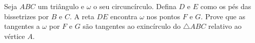 Seja $ABC$ um triângulo e $\omega$ o seu circuncírculo. Defina $D$ e $E$ como os pés das bissetrizes por $B$ e $C$. A reta $DE$ encontra $\omega$ nos pontos $F$ e $G$. Prove que as tangentes a $\omega$ por $F$ e $G$ são tangentes ao exincírculo do $\triangle ABC$ relativo ao vértice $A$.
